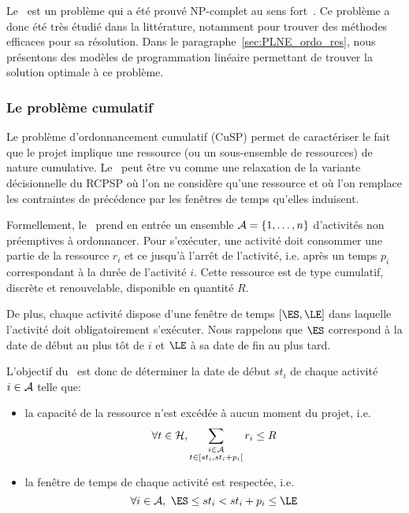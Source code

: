 Le \RCPSP~est un problème qui a été prouvé NP-complet au sens
fort~\cite{NP_RCPSP}. Ce problème a donc été très étudié dans la
littérature, notamment pour trouver des méthodes efficaces pour sa
résolution. Dans le paragraphe~\ref{sec:PLNE_ordo_res}, nous présentons des
modèles de programmation linéaire permettant de trouver la solution
optimale à ce problème. 

\subsubsection{Le problème cumulatif}

Le problème d'ordonnancement cumulatif (CuSP) permet de caractériser
le fait que le projet implique une ressource (ou un sous-ensemble de
ressources) de nature cumulative. Le \CUSP~peut être vu comme une
relaxation de la variante décisionnelle du RCPSP où l'on ne considère
qu'une ressource et où l'on remplace les contraintes de précédence par
les fenêtres de temps qu'elles induisent.

Formellement, le \CUSP~prend en entrée un ensemble $ {\cal A}=\{1,\dots,n\}$
d'activités non préemptives à ordonnancer. Pour s'exécuter, une
activité doit consommer une partie de la ressource $r_i$ et ce jusqu'à
l'arrêt de l'activité, i.e. après un temps $p_i$ correspondant à la
durée de l'activité $i$. Cette ressource est de type cumulatif,
discrète et renouvelable, disponible en quantité $R$.

De plus, chaque activité dispose d'une fenêtre de temps $[\ES,\LE]$
dans laquelle l'activité doit obligatoirement s'exécuter. Nous
rappelons que $\ES$ correspond à la date de début au plus tôt de $i$
et $\LE$ à sa date de fin au plus tard.

L'objectif du \CUSP~est donc de déterminer la date de début $st_i$ de
chaque activité $i \in {\cal A}$ telle que:
\begin{itemize}
\item la capacité de la ressource n'est excédée à aucun moment du
  projet, i.e.
  \begin{equation} \forall t \in {\cal H},\sum_{\substack{i\in {\cal A}\\ t \in
        [st_i,st_i+p_i[}} r_{i} \le  R
\label{eq:CUSP_res}
\end{equation}
\item la fenêtre de temps de chaque activité est respectée, i.e. 
  \begin{equation} \forall i \in \A,\ \ES \le st_i < st_i+p_i \le \LE \end{equation}
\end{itemize}

